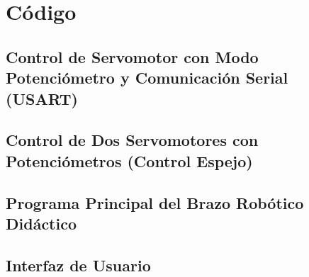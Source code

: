 \documentclass[11pt,a4paper]{article}
\begin{document}
\section{Código}

\subsection{Control de Servomotor con Modo Potenciómetro y Comunicación Serial (USART)}

\subsection{Control de Dos Servomotores con Potenciómetros (Control Espejo)}

\subsection{Programa Principal del Brazo Robótico Didáctico}


\subsection{Interfaz de Usuario}

\end{document}

